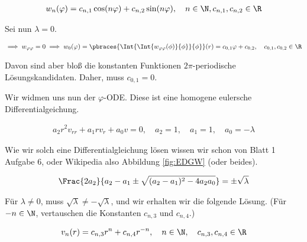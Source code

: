 \begin{solution}
\begin{enumerate}[label = (\roman*)]
    \begin{align*}
        w_n(\varphi)
        =
        c_{n, 1} \cos(n \varphi)
        +
        c_{n, 2} \sin(n \varphi),
        \quad
        n \in \N,
        c_{n, 1}, c_{n, 2} \in \R
    \end{align*}

    Sei nun $\lambda = 0$.

    \begin{align*}
        \implies
        w_{\varphi \varphi} = 0
        \implies
        w_0(\varphi)
        =
        \pbraces
        {
            \Int
            {
                \Int
                {
                    w_{\varphi \varphi}(\phi)
                }{\phi}
            }{\phi}
        }(r)
        =
        c_{0, 1} \varphi + c_{0, 2},
        \quad
        c_{0, 1}, c_{0, 2} \in \R
    \end{align*}

    Davon sind aber bloß die konstanten Funktionen $2 \pi$-periodische Lösungskandidaten.
    Daher, muss $c_{0, 1} = 0$.

    Wir widmen uns nun der $\varphi$-ODE.
    Diese ist eine homogene eulersche Differentialgeichung.

    \begin{align*}
        a_2 r^2 v_{rr}
        +
        a_1 r v_r
        +
        a_0 v = 0,
        \quad
        a_2 = 1, \quad a_1 = 1, \quad a_0 = -\lambda
    \end{align*}

    Wie wir solch eine Differentialgleichung lösen wissen wir schon von Blatt 1 Aufgabe 6, oder Wikipedia also Abbildung \ref{fig:EDGW} (oder beides).

    \begin{align*}
        \Frac
        {2 a_2}
        {
            a_2 - a_1
            \pm
            \sqrt
            {
                (a_2 - a_1)^2
                -
                4 a_2 a_0
            }
        }
        =
        \pm \sqrt{\lambda}
    \end{align*}

    Für $\lambda \neq 0$, muss $\sqrt{\lambda} \neq -\sqrt{\lambda}$, und wir erhalten wir die folgende Lösung.
    (Für $-n \in \N$, vertauschen die Konstanten $c_{n, 3}$ und $c_{n, 4}$.)

    \begin{align*}
        v_n(r)
        =
        c_{n, 3} r^n + c_{n, 4} r^{-n},
        \quad
        n \in \N,
        \quad
        c_{n, 3}, c_{n, 4} \in \R
    \end{align*}


\end{enumerate}
\end{solution}
